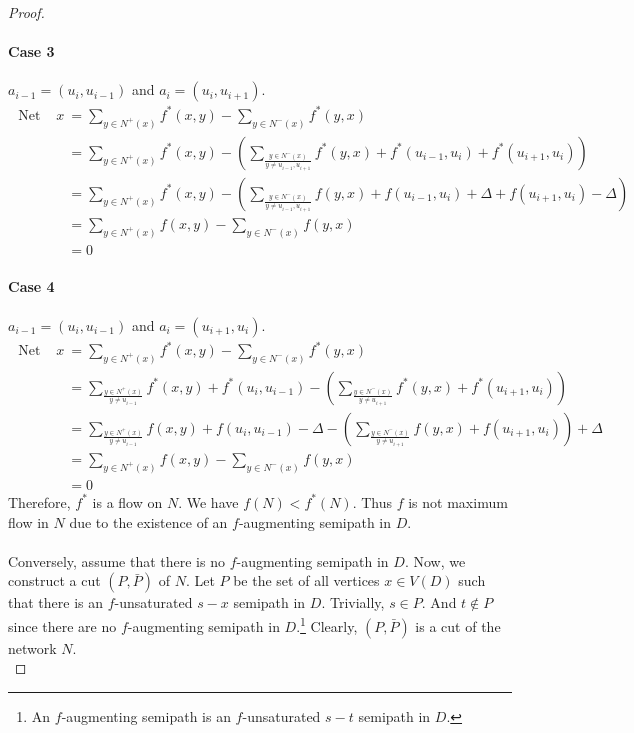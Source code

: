 \begin{proof}
	\paragraph{Case 3} $a_{i-1} = (u_i, u_{i-1})$ and $a_i = (u_i,u_{i+1})$.
	\begin{align*}
		\text{ Net flow out of } x
		& = \sum_{y \in N^+(x)} f^*(x,y) - \sum_{y \in N^-(x)} f^*(y,x) \\
		& = \sum_{y \in N^+(x)} f^*(x,y) - \left( \sum_{\frac{y \in N^-(x)}{y \ne u_{i-1}, u_{i+1}}} f^*(y,x) + f^*(u_{i-1},u_i) + f^*(u_{i+1},u_i) \right)\\
		& = \sum_{y \in N^+(x)} f^*(x,y) - \left( \sum_{\frac{y \in N^-(x)}{y \ne u_{i-1}, u_{i+1}}} f(y,x) + f(u_{i-1},u_i) + \Delta + f(u_{i+1},u_i) - \Delta \right)\\
		& = \sum_{y \in N^+(x)} f(x,y) - \sum_{y \in N^-(x)} f(y,x) \\
		& = 0
	\end{align*}

	\paragraph{Case 4} $a_{i-1} = (u_i,u_{i-1})$ and $a_i = (u_{i+1},u_i)$.
	\begin{align*}
		\text{ Net flow out of } x
		& = \sum_{y \in N^+(x)} f^*(x,y) - \sum_{y \in N^-(x)} f^*(y,x) \\
		& = \sum_{\frac{y \in N^+(x)}{y \ne u_{i-1}}} f^*(x,y) + f^*(u_i,u_{i-1}) - \left( \sum_{\frac{y \in N^-(x)}{y \ne u_{i+1}}} f^*(y,x) + f^*(u_{i+1},u_i) \right)\\
		& = \sum_{\frac{y \in N^+(x)}{y \ne u_{i-1}}} f(x,y) + f(u_i,u_{i-1}) - \Delta - \left( \sum_{\frac{y \in N^-(x)}{y \ne u_{i+1}}} f(y,x) + f(u_{i+1},u_i) \right) + \Delta \\
		& = \sum_{y \in N^+(x)} f(x,y) - \sum_{y \in N^-(x)} f(y,x) \\
		& = 0
	\end{align*}
	Therefore, $f^*$ is a flow on $N$. We have $f(N) < f^*(N)$. Thus $f$ is not maximum flow in $N$ due to the existence of an $f$-augmenting semipath in $D$.

	\paragraph{}Conversely, assume that there is no $f$-augmenting semipath in $D$. Now, we construct a cut $(P,\bar{P})$ of $N$. Let $P$ be the set of all vertices $x \in V(D)$ such that there is an $f$-unsaturated $s-x$ semipath in $D$. Trivially, $s \in P$. And $t \not\in P$ since there are no $f$-augmenting semipath in $D$.\footnote{An $f$-augmenting semipath is an $f$-unsaturated $s-t$ semipath in $D$.} Clearly, $(P,\bar{P})$ is a cut of the network $N$.\\


\end{proof}
